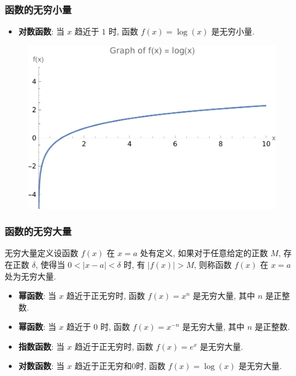 \documentclass[
10pt, 
aspectratio=43, 
]{beamer}
\begin{document}
\begin{frame}
	\frametitle{函数的无穷小量}
	\begin{itemize}
		\item \textbf{对数函数}: 当 $x$ 趋近于 $1$ 时, 函数 $f(x) = \log(x)$ 是无穷小量. 
	\end{itemize}
	\begin{figure}
		\centering
		\includegraphics[width=0.5\linewidth]{log.png}
		\label{fig: enter-label}
	\end{figure}
\end{frame}


\begin{frame}
	\frametitle{函数的无穷大量}
	
	
	\begin{block}{无穷大量定义}设函数 $f(x)$ 在 $x=a$ 处有定义, 如果对于任意给定的正数 $M$, 存在正数 $\delta$, 使得当 $0 < |x-a| < \delta$ 时, 有 $|f(x)| > M$, 则称函数 $f(x)$ 在 $x=a$ 处为无穷大量. 
	\end{block}
	\begin{itemize}
		\item<1-> \textbf{幂函数}: 当 $x$ 趋近于正无穷时, 函数 $f(x) = x^n$ 是无穷大量, 其中 $n$ 是正整数. 
		\item<1-> \textbf{幂函数}: 当 $x$ 趋近于 $0$ 时, 函数 $f(x) = x^{-n}$ 是无穷大量, 其中 $n$ 是正整数. 
		\item<2-> \textbf{指数函数}: 当 $x$ 趋近于正无穷时, 函数 $f(x) = e^x$ 是无穷大量. 
		\item<4-> \textbf{对数函数}: 当 $x$ 趋近于正无穷和$0$时, 函数 $f(x) = \log(x)$ 是无穷大量. 
	\end{itemize}
\end{frame}
\end{document}
